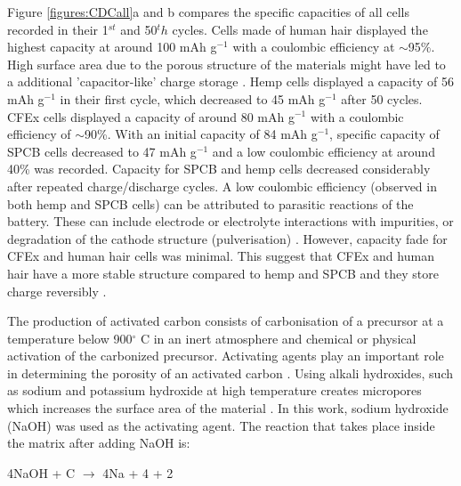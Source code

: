 \documentclass{article}
\begin{document}
Figure \ref{figures:CDCall}a and b compares the specific capacities of all cells recorded in their 1$^{st}$ and 50${^th}$ cycles. Cells made of human hair displayed the highest capacity at around 100 mAh g$^{-1}$ with a coulombic efficiency at $\sim$95$\%$. High surface area due to the porous structure of the materials might have led to a additional 'capacitor-like' charge storage \cite{frackowiak_carbon_2001}. Hemp cells displayed a capacity of 56 mAh g$^{-1}$ in their first cycle, which decreased to 45 mAh g$^{-1}$ after 50 cycles. CFEx cells displayed a capacity of around 80 mAh g$^{-1}$ with a coulombic efficiency of $\sim$90\%. With an initial capacity of 84 mAh g$^{-1}$, specific capacity of SPCB cells decreased to 47 mAh g$^{-1}$ and a low coulombic efficiency at around 40\% was recorded. Capacity for SPCB and hemp cells decreased considerably after repeated charge/discharge cycles. A low coulombic efficiency (observed in both hemp and SPCB cells) can be attributed to parasitic reactions of the battery. These can include electrode or electrolyte interactions with impurities, or degradation of the cathode structure (pulverisation) \cite{gyenes}. However, capacity fade for CFEx and human hair cells was minimal. This suggest that CFEx and human hair have a more stable structure compared to hemp and SPCB and they store charge reversibly \cite{pramanick}. 


The production of activated carbon consists of carbonisation of a precursor at a temperature below 900$^{\circ}$ C in an inert atmosphere and chemical or physical activation of the carbonized precursor. Activating agents play an important role in determining the porosity of an activated carbon \cite{arenas}. Using alkali hydroxides, such as sodium and potassium hydroxide at high temperature creates micropores which increases the surface area of the material \cite{dong_commercial_2019, liu_hair-based_2017}. In this work, sodium hydroxide (NaOH) was used as the activating agent. The reaction that takes place inside the matrix after adding NaOH is:

\begin{center}
    4NaOH + C $\longrightarrow$ 4Na + 4 + 2 \cite{satish}
\end{center}
\end{document}
